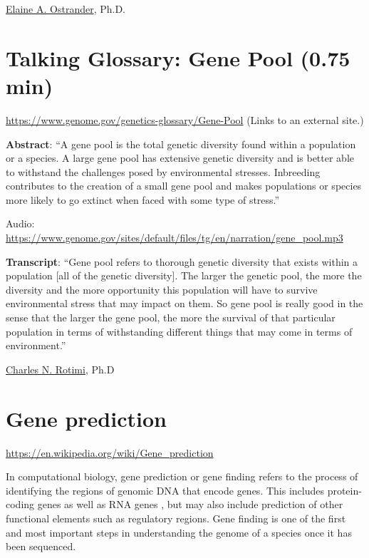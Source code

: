 \documentclass[
]{book}
\begin{document}
\href{https://www.genome.gov/staff/Elaine-A-Ostrander-PhD}{Elaine A. Ostrander}, Ph.D.

\hypertarget{talking-glossary-gene-pool-0.75-min}{%
\section{Talking Glossary: Gene Pool (0.75 min)}\label{talking-glossary-gene-pool-0.75-min}}

\url{https://www.genome.gov/genetics-glossary/Gene-Pool} (Links to an external site.)

\textbf{Abstract}: ``A gene pool is the total genetic diversity found within a population or a species. A large gene pool has extensive genetic diversity and is better able to withstand the challenges posed by environmental stresses. Inbreeding contributes to the creation of a small gene pool and makes populations or species more likely to go extinct when faced with some type of stress.''

Audio: \url{https://www.genome.gov/sites/default/files/tg/en/narration/gene_pool.mp3}

\textbf{Transcript}: ``Gene pool refers to thorough genetic diversity that exists within a population {[}all of the genetic diversity{]}. The larger the genetic pool, the more the diversity and the more opportunity this population will have to survive environmental stress that may impact on them. So gene pool is really good in the sense that the larger the gene pool, the more the survival of that particular population in terms of withstanding different things that may come in terms of environment.''

\href{https://www.genome.gov/staff/Charles-N-Rotimi-PhD}{Charles N. Rotimi}, Ph.D

\hypertarget{gene-prediction}{%
\section{Gene prediction}\label{gene-prediction}}

\url{https://en.wikipedia.org/wiki/Gene_prediction}

In computational biology, gene prediction or gene finding refers to the process of identifying the regions of genomic DNA that encode genes. This includes protein-coding genes as well as RNA genes , but may also include prediction of other functional elements such as regulatory regions. Gene finding is one of the first and most important steps in understanding the genome of a species once it has been sequenced.
\end{document}
